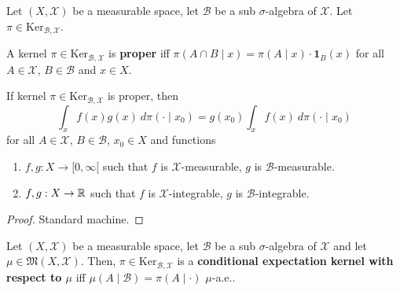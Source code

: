 Let $(X, \mathcal X)$ be a measurable space, let $\mathcal B$ be a sub $\sigma$-algebra of $\mathcal X$. Let $\pi \in \text{Ker}_{\mathcal B, \mathcal X}$.

\begin{definition}
    \label{def:proper-kernel}
    \leanok

    A kernel $\pi\in\text{Ker}_{\mathcal{B},\mathcal{X}}$ is \textbf{proper} iff $\pi(A\cap B\mid x)=\pi(A\mid x)\cdot\mathbf{1}_B(x)$ for all $A\in\mathcal{X}$, $B\in\mathcal{B}$ and $x\in X$.
\end{definition}

\begin{lemma}
    \label{lem:proper-kernel-integral}
    \leanok

    If kernel $\pi\in\text{Ker}_{\mathcal{B},\mathcal{X}}$ is proper, then
    $$\int_x f(x) g(x)\ d\pi(\cdot\mid x_0) = g(x_0)\int_x f(x)\ d\pi(\cdot\mid x_0)$$
    for all $A \in \mathcal X$, $B \in \mathcal B$, $x_0 \in X$ and functions
    \begin{enumerate}
        \item $f, g : X \to [0, \infty[$ such that $f$ is $\mathcal X$-measurable, $g$ is $\mathcal B$-measurable.
        \item $f, g : X \to \mathbb R$ such that $f$ is $\mathcal X$-integrable, $g$ is $\mathcal B$-integrable.
    \end{enumerate}
\end{lemma}
\begin{proof}

    Standard machine.
\end{proof}

\begin{definition}
    \label{def:cond-exp-ker}
    \leanok

    Let $(X,\mathcal{X})$ be a measurable space, let $\mathcal{B}$ be a sub $\sigma$-algebra of $\mathcal{X}$ and let $\mu\in\mathfrak{M}(X,\mathcal{X})$. Then, $\pi\in\text{Ker}_{\mathcal{B},\mathcal{X}}$ is a \textbf{conditional expectation kernel with respect to $\mu$} iff $\mu(A\mid \mathcal{B})=\pi(A\mid\cdot)$ $\mu$-a.e..
\end{definition}

